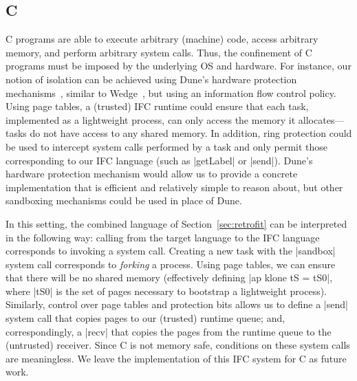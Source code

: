 \subsection{C}
\label{sec:real:c}
%
C programs are able to execute arbitrary (machine) code, access
arbitrary memory, and perform arbitrary system calls.
%
Thus, the confinement of C programs must be imposed by the underlying OS
and hardware.
%
For instance, our notion of isolation can be achieved using Dune's
hardware protection mechanisms~\cite{Belay:2012:DSU:2387880.2387913},
similar to 
Wedge~\cite{Belay:2012:DSU:2387880.2387913,
Bittau:2008:WSA:1387589.1387611}, but using an information flow control
policy.
%
Using page tables, a (trusted) IFC runtime could ensure that each task,
implemented as a lightweight process, can only access the memory it
allocates---tasks do not have access to any shared memory.
%
In addition, ring protection could be used to intercept system
calls performed by
a task and only permit those corresponding to our IFC language (such as
|getLabel| or |send|).
%
Dune's hardware protection mechanism would allow us to provide a concrete
implementation that is efficient and relatively simple to reason
about, but other sandboxing mechanisms could be used in place of Dune.

In this setting, the combined language of Section~\ref{sec:retrofit}
can be interpreted in the following way: calling from the target
language to the IFC language corresponds to invoking a system call.
%
Creating a new task with the |sandbox| system call corresponds to
\emph{forking} a process.  Using page tables, we can ensure that
there will be no shared memory
(effectively
defining |ap klone tS
= tS0|, where |tS0| is the set of pages necessary to bootstrap a
lightweight process).
%
Similarly, control over page tables and protection bits allows us to
define a |send| system call that copies pages to our
(trusted) runtime queue; and, correspondingly, a |recv| that copies
the pages from the runtime queue to the (untrusted) receiver.
%
Since C is not memory safe, conditions on these system calls are
meaningless.
%
We leave the implementation of this IFC system for C as future work.
